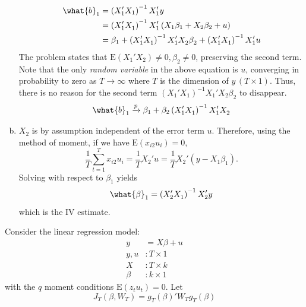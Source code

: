 \documentclass[answers]{exam}
\begin{document}
\begin{questions}
\begin{solution}
\begin{enumerate}[a)]
      \begin{align}
        \what{b}_{1} &= \left(X_{1}'X_{1}\right)^{-1}X_{1}'y\\
        &= \left(X_{1}'X_{1}^{}\right)^{-1}X_{1}'\left(X_{1}\beta_{1}+X_{2}\beta_{2}+u\right)\\
        &= \beta_{1}+\left(X_{1}'X_{1}^{}\right)^{-1}X_{1}'X_{2}^{}\beta_{2}^{}+\left(X_{1}'X_{1}^{}\right)^{-1}X_{1}'u
      \end{align}
      The problem states that $\mathrm{E}\left(X_{1}'X_{2}^{}\right)\neq 0, \beta_{2}\neq 0$, preserving the second term. Note that the only \emph{random variable} in the above equation is $u$, converging in probability to zero as $T\to\infty$ where $T$ is the dimension of $y\, \left(T\times 1\right)$. Thus, there is no reason for the second term $\left(X_{1}'X_{1}^{}\right)^{-1}X_{1}'X_{2}^{}\beta_{2}^{}$ to disappear.
      \begin{equation}
        \what{b}_{1}\xrightarrow{p} \beta_{1}+\beta_{2}\left(X_{1}'X_{1}^{}\right)^{-1}X_{1}'X_{2}^{}
      \end{equation}
      \item $X_{2}$ is by assumption independent of the error term $u$. Therefore, using the method of moment, if we have $\mathrm{E}\left(x_{i2}u_{i}\right)=0$,
      \begin{equation}
        \dfrac{1}{T}\sum_{t=1}^{T}x_{i2}u_{i}=\dfrac{1}{T}X_{2}'u=\dfrac{1}{T}X_{2}'\left(y-X_{1}\beta_{1}\right).
      \end{equation}
      Solving with respect to $\beta_{1}$ yields
      \begin{equation}
        \what{\beta}_{1} = \left(X_{2}'X_{1}^{}\right)^{-1}X_{2}'y
      \end{equation}
      which is the IV estimate.
    \end{enumerate}
  \end{solution}
  \question
  Consider the linear regression model:
  \begin{align}
    y &= X\beta+u\\
    y,u &: T\times 1\\
    X &: T\times k\\
    \beta &: k\times 1
  \end{align}
  with the $q$ moment conditions $\mathrm{E}\left(z_{t}u_{t}\right)=0$. Let
  \begin{equation}
    J_{T}\left(\beta,W_{T}\right)=g_{T}\left(\beta\right)'W_{T}g_{T}\left(\beta\right)
  \end{equation}

\end{questions}
\end{document}
